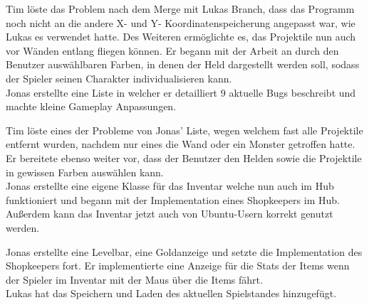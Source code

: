 
Tim löste das Problem nach dem Merge mit Lukas Branch, dass das Programm noch nicht an die andere X- und Y- Koordinatenspeicherung angepasst war, wie Lukas es verwendet hatte. Des Weiteren ermöglichte es, das Projektile nun auch vor Wänden entlang fliegen können. Er begann mit der Arbeit an durch den Benutzer auswählbaren Farben, in denen der Held dargestellt werden soll, sodass der Spieler seinen Charakter individualisieren kann. \\
Jonas erstellte eine Liste in welcher er detailliert 9 aktuelle Bugs beschreibt und machte kleine Gameplay Anpassungen.\\


Tim löste eines der Probleme von Jonas' Liste, wegen welchem fast alle Projektile entfernt wurden, nachdem nur eines die Wand oder ein Monster getroffen hatte. Er bereitete ebenso weiter vor, dass der Benutzer den Helden sowie die Projektile in gewissen Farben auswählen kann. \\
Jonas erstellte eine eigene Klasse für das Inventar welche nun auch im Hub funktioniert und begann mit der Implementation eines Shopkeepers im Hub. Außerdem kann das Inventar jetzt auch von Ubuntu-Usern korrekt genutzt werden. \\


Jonas erstellte eine Levelbar, eine Goldanzeige und setzte die Implementation des Shopkeepers fort. Er implementierte eine Anzeige für die Stats der Items wenn der Spieler im Inventar mit der Maus über die Items fährt. \\
Lukas hat das Speichern und Laden des aktuellen Spielstandes hinzugefügt. \\


